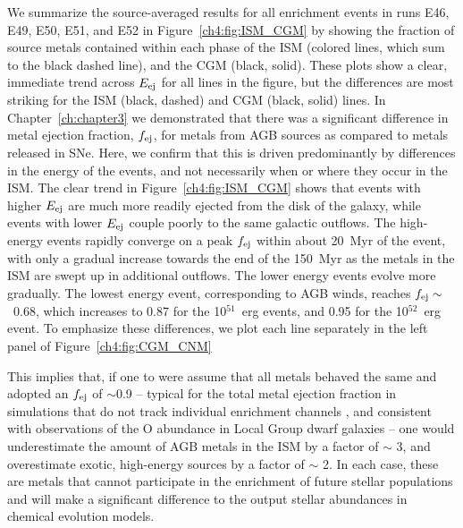 We summarize the source-averaged results for all enrichment events in runs \runone E46, \runone E49, \runone E50, \runone E51, and \runone E52 in Figure~\ref{ch4:fig:ISM_CGM} by showing the fraction of source metals contained within each phase of the ISM (colored lines, which sum to the black dashed line), and the CGM (black, solid). These plots show a clear, immediate trend across $E_{\rm ej}$ for all lines in the figure, but the differences are most striking for the ISM (black, dashed) and CGM (black, solid) lines. In Chapter~\ref{ch:chapter3}
we demonstrated that there was a significant difference in metal ejection fraction, $f_{\rm ej}$, for metals from AGB sources as compared to metals released in SNe. Here, we confirm that this is driven predominantly by differences in the energy of the events, and not necessarily when or where they occur in the ISM. The clear trend in Figure~\ref{ch4:fig:ISM_CGM} shows that events with higher $E_{\rm ej}$ are much more readily ejected from the disk of the galaxy, while events with lower $E_{\rm ej}$ couple poorly to the same galactic outflows.
The high-energy events rapidly converge on a peak $f_{\rm ej}$ within about 20~Myr of the event, with only a gradual increase towards the end of the 150~Myr as the metals in the ISM are swept up in additional outflows. The lower energy events evolve more gradually. The lowest energy event, corresponding to AGB winds, reaches $f_{\rm ej} \sim$~0.68, which increases to 0.87 for the 10$^{51}$~erg events, and 0.95 for the 10$^{52}$~erg event. To emphasize these differences, we plot each line separately in the left panel of Figure~\ref{ch4:fig:CGM_CNM}

This implies that, if one to were assume that all metals behaved the same and adopted an $f_{\rm ej}$ of $\sim$0.9 -- typical for the total metal ejection fraction in simulations that do not track individual enrichment channels \citep[e.g.][]{Muratov2017,Christensen2018}, and consistent with observations of the O abundance in Local Group dwarf galaxies \citep[e.g.][]{Kirby2011,McQuinn2015} -- one would underestimate the amount of AGB metals in the ISM by a factor of $\sim$ 3, and overestimate exotic, high-energy sources by a factor of $\sim$ 2. In each case, these are metals that cannot participate in the enrichment of future stellar populations and will make a significant difference to the output stellar abundances in chemical evolution models.

